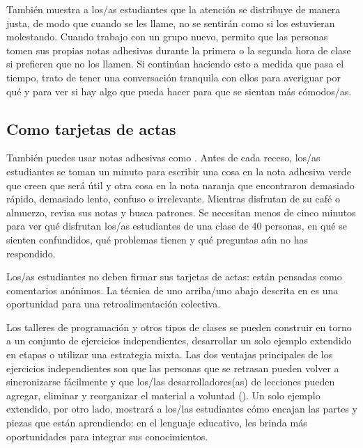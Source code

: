 También muestra a los/as estudiantes que la atención se distribuye de manera justa,
de modo que cuando se les llame,
no se sentirán como si los estuvieran molestando.
Cuando trabajo con un grupo nuevo,
permito que las personas tomen sus propias notas adhesivas
durante la primera o la segunda hora de clase
si prefieren que no los llamen.
Si continúan haciendo esto a medida que pasa el tiempo,
trato de tener una conversación tranquila con ellos para averiguar por qué
y para ver si hay algo que pueda hacer para que se sientan más cómodos/as.

\subsection*{Como tarjetas de actas}

También puedes usar notas adhesivas como .
Antes de cada receso,
los/as estudiantes se toman un minuto para escribir una cosa en la nota adhesiva verde
que creen que será útil
y otra cosa en la nota naranja
que encontraron demasiado rápido,
demasiado lento,
confuso
o irrelevante.
Mientras disfrutan de su café o almuerzo,
revisa sus notas y busca patrones.
Se necesitan menos de cinco minutos para ver qué disfrutan los/as estudiantes de una clase de 40 personas,
en qué se sienten confundidos,
qué problemas tienen
y qué preguntas aún no has respondido.

Los/as estudiantes no deben firmar sus tarjetas de actas:
están pensadas como comentarios anónimos.
La técnica de uno arriba/uno abajo descrita en 
es una oportunidad para una retroalimentación colectiva.


Los talleres de programación y otros tipos de clases
se pueden construir en torno a un conjunto de ejercicios independientes,
desarrollar un solo ejemplo extendido en etapas
o utilizar una estrategia mixta.
Las dos ventajas principales de los ejercicios independientes son que
las personas que se retrasan pueden volver a sincronizarse fácilmente
y que los/las desarrolladores(as) de lecciones pueden agregar, eliminar y reorganizar el material a voluntad
().
Un solo ejemplo extendido,
por otro lado,
mostrará a los/las estudiantes cómo encajan las partes y piezas que están aprendiendo:
en el lenguaje educativo,
les brinda más oportunidades para integrar sus conocimientos.

